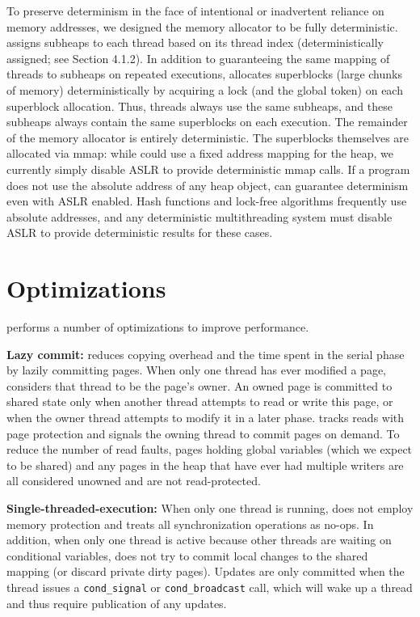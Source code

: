 To preserve determinism in the face of intentional or inadvertent reliance on memory addresses, we designed the \dthreads{} memory allocator to be fully deterministic. \dthreads{} assigns subheaps to each thread based on its thread index (deterministically assigned; see Section 4.1.2). In addition to guaranteeing the same mapping of threads to subheaps on repeated executions, \dthreads{} allocates superblocks (large chunks of memory) deterministically
by acquiring a lock (and the global token) on each
superblock allocation. Thus, threads always use the same subheaps, and these subheaps always contain the same superblocks on each execution. The remainder of the memory allocator is entirely deterministic. The superblocks themselves are allocated via mmap: while \dthreads{} could use a fixed address mapping for the heap, we currently simply disable ASLR to provide deterministic mmap calls. If a program does not use the absolute address of any heap object, \dthreads{} can guarantee determinism even with ASLR enabled.
Hash functions and lock-free algorithms frequently use absolute addresses, and any deterministic multithreading system must disable ASLR to provide deterministic results for these cases.


\section{Optimizations}
\label{sec:dthreads-optimization}

\dthreads{} performs a number of optimizations to improve performance.

\textbf{Lazy commit:} \dthreads{} reduces copying overhead and the time spent in the serial phase by lazily committing pages. When only one thread has ever modified a page, \dthreads{} considers that thread to be the page’s owner. An owned page is committed to shared state only when another thread attempts to read or write this page, or when the owner thread attempts to modify it in a later phase. \dthreads{} tracks reads with page protection and signals the owning thread to commit pages on demand. To reduce the number of read faults, pages holding global variables (which we expect to be shared) and any pages in the heap that have ever had multiple writers are all considered unowned and are not read-protected.

\textbf{Single-threaded-execution: }
When only one thread is running, \dthreads{} does not employ memory protection and treats all synchronization operations as no-ops. In addition, when only one thread is active because other threads are waiting on conditional variables, 
\dthreads{} does not try to commit local changes to the shared mapping (or discard private dirty pages). Updates are only committed when the thread issues a \texttt{cond\_signal} or \texttt{cond\_broadcast} call, which will wake up a thread and thus require publication of any updates.

